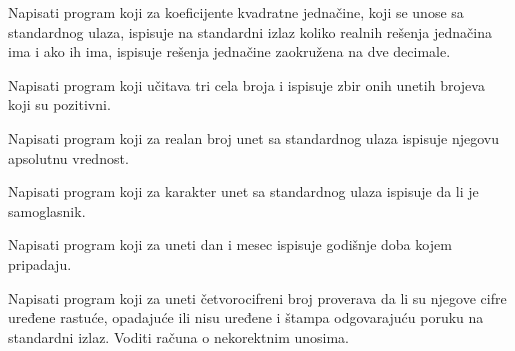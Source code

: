 \begin{Exercise}[label=v1.2_07] 
Napisati program koji za koeficijente kvadratne jednačine,
koji se unose sa standardnog ulaza, 
ispisuje na standardni izlaz koliko realnih rešenja jednačina ima i ako ih ima, ispisuje rešenja jednačine
zaokružena na dve decimale.
\end{Exercise}
\begin{Answer}[ref=v1.2_07]
\end{Answer}

\begin{Exercise}[label=v1.2_09] 
Napisati program koji učitava tri cela broja i ispisuje zbir onih unetih brojeva
koji su pozitivni.
\end{Exercise}
\begin{Answer}[ref=v1.2_09]
\end{Answer}

\begin{Exercise}[label=v1.2_10] 
Napisati program koji za realan broj unet sa standardnog ulaza
ispisuje njegovu apsolutnu vrednost.
\end{Exercise}
\begin{Answer}[ref=v1.2_10]
\end{Answer}

\begin{Exercise}[label=v1.2_11] 
Napisati program koji za karakter unet sa standardnog ulaza ispisuje
da li je samoglasnik.
\end{Exercise}
\begin{Answer}[ref=v1.2_11]
\end{Answer}

\begin{Exercise}[label=v1.2_12] 
Napisati program koji za uneti dan i mesec ispisuje godišnje doba kojem pripadaju.  
\end{Exercise}
\begin{Answer}[ref=v1.2_12]
\end{Answer}

\begin{Exercise}[label=v1.2_13] 
Napisati program koji za uneti četvorocifreni broj proverava
da li su njegove cifre uređene rastuće, opadajuće ili nisu
uređene i štampa odgovarajuću poruku na standardni
izlaz. Voditi računa o nekorektnim unosima. 
\end{Exercise}
\begin{Answer}[ref=v1.2_13]
\end{Answer}


